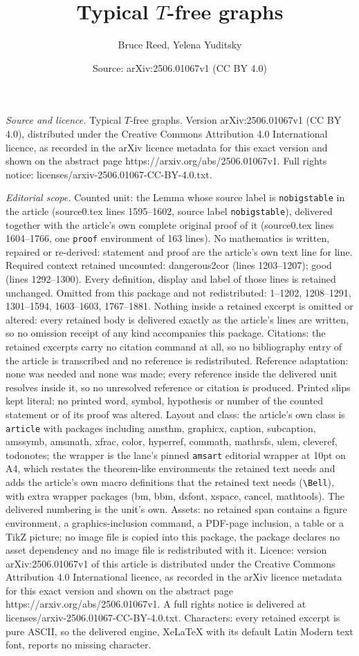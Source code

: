 \documentclass[10pt,a4paper]{amsart}
\title[Typical $T$-free graphs]{Typical $T$-free graphs}
\author{Bruce Reed, Yelena Yuditsky}
\date{Source: arXiv:2506.01067v1 (CC BY 4.0)}
\begin{document}
\maketitle

\noindent\emph{Source and licence.} Typical $T$-free graphs. Version arXiv:2506.01067v1 (CC BY 4.0), distributed under the Creative Commons Attribution 4.0 International licence, as recorded in the arXiv licence metadata for this exact version and shown on the abstract page https://arxiv.org/abs/2506.01067v1. Full rights notice: licenses/arxiv-2506.01067-CC-BY-4.0.txt.\par\smallskip

\noindent\textit{Editorial scope.} Counted unit: the Lemma whose source label is \texttt{nobigstable} in the article (source0.tex lines 1595--1602, source label \texttt{nobigstable}), delivered together with the article's own complete original proof of it (source0.tex lines 1604--1766, one \texttt{proof} environment of 163 lines). No mathematics is written, repaired or re-derived: statement and proof are the article's own text line for line. Required context retained uncounted: dangerous2cor (lines 1203--1207); good (lines 1292--1300). Every definition, display and label of those lines is retained unchanged. Omitted from this package and not redistributed: 1--1202, 1208--1291, 1301--1594, 1603--1603, 1767--1881. Nothing inside a retained excerpt is omitted or altered: every retained body is delivered exactly as the article's lines are written, so no omission receipt of any kind accompanies this package. Citations: the retained excerpts carry no citation command at all, so no bibliography entry of the article is transcribed and no reference is redistributed. Reference adaptation: none was needed and none was made; every reference inside the delivered unit resolves inside it, so no unresolved reference or citation is produced. Printed slips kept literal: no printed word, symbol, hypothesis or number of the counted statement or of its proof was altered. Layout and class: the article's own class is \texttt{article} with packages including amsthm, graphicx, caption, subcaption, amssymb, amsmath, xfrac, color, hyperref, commath, mathrsfs, ulem, cleveref, todonotes; the wrapper is the lane's pinned \texttt{amsart} editorial wrapper at 10pt on A4, which restates the theorem-like environments the retained text needs and adds the article's own macro definitions that the retained text needs (\texttt{\textbackslash Bell}), with extra wrapper packages (bm, bbm, dsfont, xspace, cancel, mathtools). The delivered numbering is the unit's own. Assets: no retained span contains a figure environment, a graphics-inclusion command, a PDF-page inclusion, a table or a TikZ picture; no image file is copied into this package, the package declares no asset dependency and no image file is redistributed with it. Licence: version arXiv:2506.01067v1 of this article is distributed under the Creative Commons Attribution 4.0 International licence, as recorded in the arXiv licence metadata for this exact version and shown on the abstract page https://arxiv.org/abs/2506.01067v1. A full rights notice is delivered at licenses/arxiv-2506.01067-CC-BY-4.0.txt. Characters: every retained excerpt is pure ASCII, so the delivered engine, XeLaTeX with its default Latin Modern text font, reports no missing character.
\end{document}
